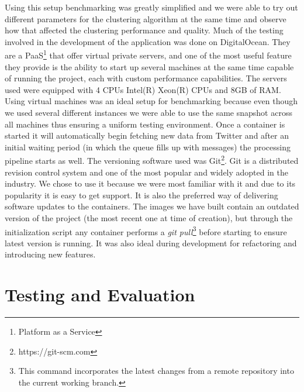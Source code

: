 \newline
Using this setup benchmarking was greatly simplified and we were able to try out different parameters for the clustering algorithm at the same time and observe how that affected the clustering performance and quality.
Much of the testing involved in the development of the application was done on DigitalOcean. They are a PaaS\footnote{Platform as a Service} that offer virtual private servers, and one of the most useful feature they provide is the ability to start up several machines at the same time capable of running the project, each with custom performance capabilities. The servers used were equipped with 4 CPUs Intel(R) Xeon(R) CPUs and 8GB of RAM. Using virtual machines was an ideal setup for benchmarking because even though we used several different instances we were able to use the same snapshot across all machines thus ensuring a uniform testing environment. Once a container is started it will automatically begin fetching new data from Twitter and after an initial waiting period (in which the queue fills up with messages) the processing pipeline starts as well.
\newline
\newline
The versioning software used was Git\footnote{https://git-scm.com}. Git is a distributed revision control system and one of the most popular and widely adopted in the industry. We chose to use it because we were most familiar with it and due to its popularity it is easy to get support. It is also the preferred way of delivering software updates to the containers. The images we have built contain an outdated version of the project (the most recent one at time of creation), but through the initialization script any container performs a \textit{git pull}\footnote{This command incorporates the latest changes from a remote repository into the current working branch.} before starting {\project}  to ensure latest version is running. It was also ideal during development for refactoring and introducing new features.

\section{Testing and Evaluation}
\label{sec:testing}

